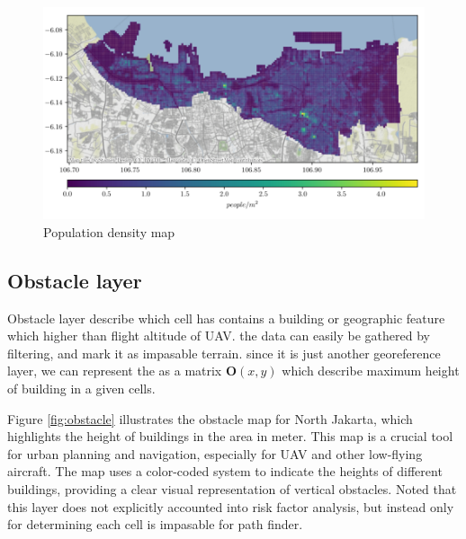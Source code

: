 \documentclass[12pt]{report}
\begin{document}
            \begin{figure}[H]
                \centering
                \includegraphics[width=\textwidth]{Plot/pop_dense.PNG}
                \caption{Population density map}
                \label{fig:population}
            \end{figure}

        \subsection{Obstacle layer}
            Obstacle layer describe which cell has contains a building or geographic feature which higher than flight
            altitude of UAV. the data can easily be gathered by filtering, and mark it as impasable terrain. since it is
            just another georeference layer, we can represent the as a matrix \(\mathbf{O}(x, y)\) which describe
            maximum height of building in a given cells. 

            Figure \ref{fig:obstacle} illustrates the obstacle map for North Jakarta, which highlights the height of
            buildings in the area in meter. This map is a crucial tool for urban planning and navigation, especially for
            UAV and other low-flying aircraft. The map uses a color-coded system to indicate the heights of different
            buildings, providing a clear visual representation of vertical obstacles. Noted that this layer does not
            explicitly accounted into risk factor analysis, but instead only for determining each cell is impasable for
            path finder.
\end{document}
